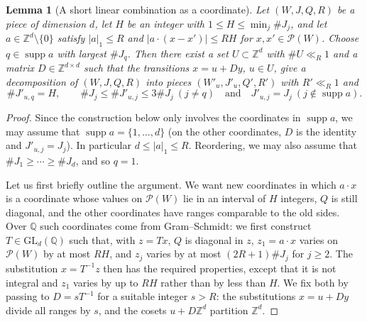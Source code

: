 \documentclass[a4paper,reqno,12pt]{amsart}
\theoremstyle{plain}
\newtheorem{lemma}[theorem]{Lemma}
\theoremstyle{plain}
\theoremstyle{remark}
\theoremstyle{plain}
\newcommand{\cP}{\mathscr{P}}
\newcommand{\z}{\mathbb{Z}}
\newcommand{\Z}{\mathbb{Z}}
\newcommand{\supp}{\operatorname{supp}}
\theoremstyle{plain}
\theoremstyle{plain}
\begin{document}
{\begin{lemma}[A short linear combination as a coordinate]\label{lem:short-coordinate}
Let $(W,J,Q,R)$ be a piece of dimension $d$, let $H$ be an integer with $1\le H\le\min_j\#J_j$, and let
$a\in\Z^d\setminus\{0\}$ satisfy $|a|_1\le R$ and $|a\cdot(x-x')|\le RH$ for $x,x'\in\cP(W)$.
Choose $q\in\supp a$ with largest $\#J_q$. Then there exist a set $U\subset\Z^d$ with $\# U\ll_R 1$ and a matrix
$D\in\Z^{d\times d}$ such that the transitions $x=u+Dy$, $u\in U$, give a
decomposition of $(W,J,Q,R)$ into pieces $(W'_u,J'_u,Q',R')$ with $R'\ll_R1$ and
\[
 \#J'_{u,q}=H,\qquad \#J_j\le\#J'_{u,j}\le3\#J_j\ (j\ne q) \quad \text{and} \quad J'_{u,j}=J_j\ (j\notin\supp a).
\]
\end{lemma}
\begin{proof}
Since the construction below only involves the coordinates in $\supp a$, we may assume that
$\supp a=\{1,\ldots,d\}$ (on the other coordinates, $D$ is the identity and $J'_{u,j}=J_j$). In
particular $d\le|a|_1\le R$. Reordering, we may also assume that $\#J_1\ge\cdots\ge\#J_d$, and so $q=1$.

Let us first briefly outline the argument. We want new coordinates in which $a\cdot x$ is a
coordinate whose values on $\cP(W)$ lie in an interval of $H$ integers, $Q$ is still diagonal, and the other coordinates have ranges comparable to the old sides. Over $\mathbb Q$ such
coordinates come from Gram--Schmidt: we first construct $T\in\mathrm{GL}_d(\mathbb Q)$ such that, with
$z=Tx$, $Q$ is diagonal in $z$, $z_1=a\cdot x$ varies on $\cP(W)$ by at most $RH$, and $z_j$ varies by at
most $(2R+1)\#J_j$ for $j\ge2$. The substitution $x=T^{-1}z$ then has the required properties, except
that it is not integral and $z_1$ varies by up to $RH$ rather than by less than $H$. We fix both by passing to
$D=sT^{-1}$ for a suitable integer $s>R$: the substitutions $x=u+Dy$ divide all ranges by $s$, and the
cosets $u+D\z^d$ partition $\z^d$.


\end{proof}}
\end{document}
